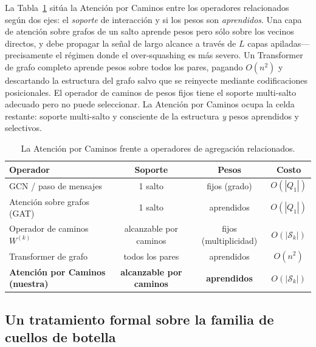 La Tabla~\ref{tab:relation} sitúa la Atención por Caminos entre los operadores relacionados según dos
ejes: el \emph{soporte} de interacción y si los pesos son
\emph{aprendidos}. Una capa de atención sobre grafos de un salto \cite{velickovic2017graph} aprende
pesos pero sólo sobre los vecinos directos, y debe propagar la señal de largo alcance
a través de $L$ capas apiladas---precisamente el régimen donde el over-squashing es más severo. Un
Transformer de grafo completo \cite{vaswani2017attention} aprende pesos sobre todos los pares,
pagando $O(n^2)$ y descartando la estructura del grafo salvo que se reinyecte mediante
codificaciones posicionales. El operador de caminos de pesos fijos tiene el soporte multi-salto
adecuado pero no puede seleccionar. La Atención por Caminos ocupa la celda restante: soporte
multi-salto y consciente de la estructura \emph{y} pesos aprendidos y selectivos.

\begin{table}[t]
\centering
\caption{La Atención por Caminos frente a operadores de agregación relacionados.}
\label{tab:relation}
\begin{tabular}{lccc}
\toprule
\textbf{Operador} & \textbf{Soporte} & \textbf{Pesos} & \textbf{Costo} \\
\midrule
GCN / paso de mensajes       & 1 salto      & fijos (grado) & $O(|Q_1|)$ \\
Atención sobre grafos (GAT)       & 1 salto      & aprendidos        & $O(|Q_1|)$ \\
Operador de caminos $W^{(k)}$     & alcanzable por caminos & fijos (multiplicidad) & $O(|\mathcal{S}_k|)$ \\
Transformer de grafo           & todos los pares  & aprendidos        & $O(n^2)$ \\
\textbf{Atención por Caminos (nuestra)} & \textbf{alcanzable por caminos} & \textbf{aprendidos} & $O(|\mathcal{S}_k|)$ \\
\bottomrule
\end{tabular}
\end{table}

\subsection{Un tratamiento formal sobre la familia de cuellos de botella}
\label{sec:theory}


